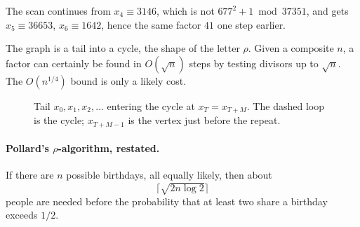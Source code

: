 \begin{remark}
The scan continues from $x_4\equiv 3146$, which is not $677^2+1\bmod 37351$, and gets $x_5\equiv 36653$, $x_6\equiv 1642$, hence the same factor $41$ one step earlier.
\end{remark}

The graph is a tail into a cycle, the shape of the letter $\rho$. Given a composite $n$, a factor can certainly be found in $O(\sqrt{n})$ steps by testing divisors up to $\sqrt{n}$. The $O(n^{1/4})$ bound is only a likely cost.

\begin{figure}[H]
\centering
{}
\caption{Tail $x_0,x_1,x_2,\ldots$ entering the cycle at $x_T=x_{T+M}$. The dashed loop is the cycle; $x_{T+M-1}$ is the vertex just before the repeat.}
\end{figure}


\paragraph{Pollard's $\rho$-algorithm, restated.}
If there are $n$ possible birthdays, all equally likely, then about
\[
    \bigl\lceil\sqrt{2n\log 2}\bigr\rceil
\]
people are needed before the probability that at least two share a birthday exceeds $1/2$.

